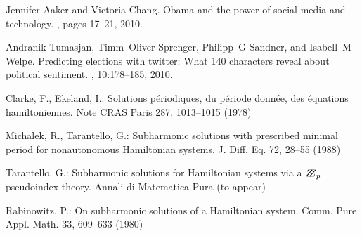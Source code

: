 \documentclass{llncs}
\begin{document}
	
	\begin{thebibliography}{5}
		Jennifer Aaker and Victoria Chang.
		\newblock Obama and the power of social media and technology.
		, pages 17--21, 2010.
		
		
		
		Andranik Tumasjan, Timm~Oliver Sprenger, Philipp~G Sandner, and Isabell~M
		Welpe.
		\newblock Predicting elections with twitter: What 140 characters reveal about
		political sentiment.
		, 10:178--185, 2010.
		
		
		Clarke, F., Ekeland, I.:
		Solutions p\'{e}riodiques, du
		p\'{e}riode donn\'{e}e, des \'{e}quations hamiltoniennes.
		Note CRAS Paris 287, 1013--1015 (1978)
		
		Michalek, R., Tarantello, G.:
		Subharmonic solutions with prescribed minimal
		period for nonautonomous Hamiltonian systems.
		J. Diff. Eq. 72, 28--55 (1988)
		
		Tarantello, G.:
		Subharmonic solutions for Hamiltonian
		systems via a $\bbbz_{p}$ pseudoindex theory.
		Annali di Matematica Pura (to appear)
		
		Rabinowitz, P.:
		On subharmonic solutions of a Hamiltonian system.
		Comm. Pure Appl. Math. 33, 609--633 (1980)
		
	\end{thebibliography}
	
	\clearpage
	\renewcommand{\indexname}{Author Index}
	\printindex
	\clearpage
\end{document}
